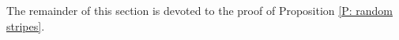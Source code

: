 \documentclass[12pt]{amsart}
\begin{document}
The remainder of this section is devoted to the proof of Proposition \ref{P: random stripes}.

%
%	
%	
\end{document}
